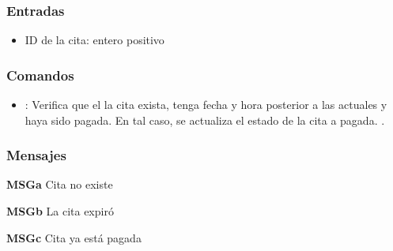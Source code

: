 \subsubsection{Entradas}
\begin{itemize}
	\item ID de la cita: entero positivo
\end{itemize}

\subsubsection{Comandos}
\begin{itemize}
	\item {}:  Verifica que el la cita exista, tenga fecha y hora posterior a las actuales y haya sido pagada. En tal caso, se actualiza el estado de la cita a pagada.  .	
\end{itemize}

\subsubsection{Mensajes}
\begin{Citemize}
	\item {\bf MSGa} Cita no existe
	\item {\bf MSGb} La cita expiró
	\item {\bf MSGc} Cita ya está pagada
\end{Citemize}

